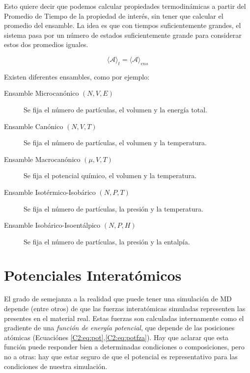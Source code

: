Esto quiere decir que podemos calcular propiedades termodinámicas a partir del Promedio de Tiempo de la propiedad de interés, sin tener que calcular el promedio del ensamble. La idea es que con tiempos suficientemente grandes, el sistema pasa por un número de estados suficientemente grande para considerar estos dos promedios iguales.

\begin{equation}
\langle \mathbf{\mathcal{A}} \rangle _{t} = \langle \mathbf{\mathcal{A}} \rangle _{ens}
\end{equation}

Existen diferentes ensambles, como por ejemplo:

\begin{description}
	\item[Ensamble Microcanónico $(N,V,E)$] Se fija el número de partículas, el volumen y la energía total.
	\item[Ensamble Canónico $(N,V,T)$] Se fija el número de partículas, el volumen y la temperatura.
	\item[Ensamble Macrocanónico $(\mu,V,T)$] Se fija el potencial químico, el volumen y la temperatura.
	\item[Ensamble Isotérmico-Isobárico $(N,P,T)$] Se fija el número de partículas, la presión y la temperatura.
	\item[Ensamble Isobárico-Isoentálpico $(N,P,H)$] Se fija el número de partículas, la presión y la entalpía.
\end{description}

\section{Potenciales Interatómicos}
\label{S2_3}

El grado de semejanza a la realidad que puede tener una simulación de MD depende (entre otros) de que las fuerzas interatómicas simuladas representen las presentes en el material real. Estas fuerzas son calculadas internamente como el gradiente de una \textit{función de energía potencial}, que depende de las posiciones atómicas (Ecuaciónes \ref{C2:eq:pot},\ref{C2:eq:potfza}). Hay que aclarar que esta función puede responder bien a determinadas condiciones o composiciones, pero no a otras: hay que estar seguro de que el potencial es representativo para las condiciones de nuestra simulación.

